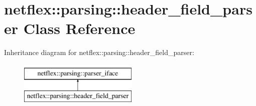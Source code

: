 \hypertarget{classnetflex_1_1parsing_1_1header__field__parser}{}\section{netflex\+:\+:parsing\+:\+:header\+\_\+field\+\_\+parser Class Reference}
\label{classnetflex_1_1parsing_1_1header__field__parser}
Inheritance diagram for netflex\+:\+:parsing\+:\+:header\+\_\+field\+\_\+parser\+:\begin{figure}[H]
\begin{center}
\leavevmode
\includegraphics[height=2.000000cm]{classnetflex_1_1parsing_1_1header__field__parser}
\end{center}
\end{figure}
